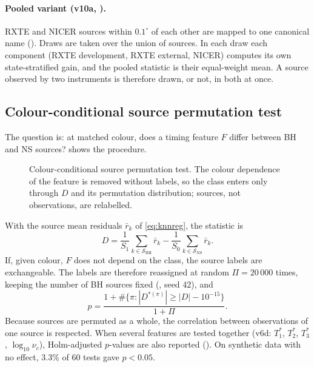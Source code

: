 \paragraph{Pooled variant (v10a, ).} RXTE and NICER sources within $0.1^\circ$ of each other are
mapped to one canonical name (). Draws are taken over the union of sources. In each draw each
component (RXTE development, RXTE external, NICER) computes its own state-stratified gain, and the pooled statistic is their
equal-weight mean. A source observed by two instruments is therefore drawn, or not, in both at once.

\subsection{Colour-conditional source permutation test}\label{sec:permutation}
The question is: at matched colour, does a timing feature $F$ differ between BH and NS sources?  shows
the procedure.

\begin{figure}[htbp]
\centering

\caption{Colour-conditional source permutation test. The colour dependence of the feature is removed without labels, so
the class enters only through $D$ and its permutation distribution; sources, not observations, are relabelled.}\label{fig:permflow}
\end{figure}

With the source mean residuals $\bar r_k$ of \cref{eq:knnreg}, the statistic is
\begin{equation}
D=\frac1{S_1}\sum_{k\in\mathcal S_\mathrm{BH}}\bar r_k-\frac1{S_0}\sum_{k\in\mathcal S_\mathrm{NS}}\bar r_k.\label{eq:D}
\end{equation}
If, given colour, $F$ does not depend on the class, the source labels are exchangeable. The labels are therefore reassigned
at random $\Pi=20\,000$ times, keeping the number of BH sources fixed (, seed 42), and
\begin{equation}
p=\frac{1+\#\{\pi:|D^{\ast(\pi)}|\ge|D|-10^{-15}\}}{1+\Pi}.\label{eq:permp}
\end{equation}
Because sources are permuted as a whole, the correlation between observations of one source is respected. When several
features are tested together (v6d: $T^\ast_1$, $T^\ast_2$, $T^\ast_3$, $\log_{10}\nu_c$), Holm-adjusted $p$-values are also
reported (). On synthetic data with no effect, 3.3\% of 60 tests gave $p<0.05$.

